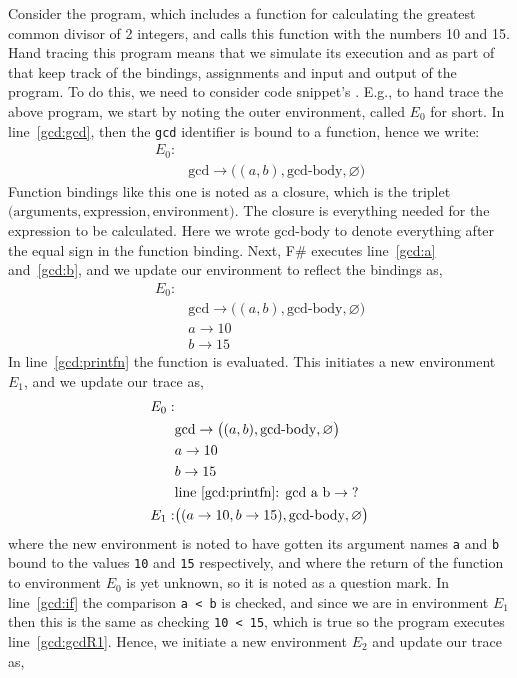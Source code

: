 Consider the program,
%
%
which includes a function for calculating the greatest common divisor of 2 integers, and calls this function with the numbers 10 and 15. Hand tracing this program means that we simulate its execution and as part of that keep track of the bindings, assignments and input and output of the program. To do this, we need to consider code snippet's . E.g., to hand trace the above program, we start by noting the outer environment, called $E_0$ for short. In line~\ref{gcd:gcd}, then the \lstinline!gcd! identifier is bound to a function, hence we write:
\begin{align*}
  E_0:&\\
  & \text{gcd} \rightarrow \big((a, b), \text{gcd-body}, \varnothing\big)
\end{align*}
Function bindings like this one is noted as a closure, which is the triplet $\big(\text{arguments}, \text{expression}, \text{environment}\big)$. The closure is everything needed for the expression to be calculated. Here we wrote $\text{gcd-body}$ to denote everything after the equal sign in the function binding. Next, F\# executes line~\ref{gcd:a} and~\ref{gcd:b}, and we update our environment to reflect the bindings as, 
\begin{align*}
  E_0:&\\
  & \text{gcd} \rightarrow \big((a, b), \text{gcd-body}, \varnothing\big)\\
  & a \rightarrow 10\\
  & b \rightarrow 15
\end{align*}
In line~\ref{gcd:printfn} the function is evaluated. This initiates a new environment $E_1$, and we update our trace as,
\begin{align*}
  E_0:&\\
      & \text{gcd} \rightarrow \big((a, b), \text{gcd-body}, \varnothing\big)\\
      & a \rightarrow 10\\
      & b \rightarrow 15\\
      & \text{line~\ref{gcd:printfn}: gcd a b} \rightarrow \text{?}\\
  E_1:& \big((a \rightarrow 10, b \rightarrow 15), \text{gcd-body}, \varnothing\big)\\
\end{align*}
where the new environment is noted to have gotten its argument names \lstinline!a! and \lstinline!b! bound to the values \lstinline!10! and \lstinline!15! respectively, and where the return of the function to environment $E_0$ is yet unknown, so it is noted as a question mark. In line~\ref{gcd:if} the comparison \lstinline!a < b! is checked, and since we are in environment $E_1$ then this is the same as checking \lstinline!10 < 15!, which is true so the program executes line~\ref{gcd:gcdR1}. Hence, we initiate a new environment $E_2$ and update our trace as,
